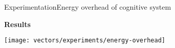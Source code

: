 \begin{frame}{Experimentation}{Energy overhead of cognitive system}
\vspace{-0.3cm}
\begin{block}{\small \textbf{Results}}
{
  \centering
  \texttt{[image: vectors/experiments/energy-overhead]}
  \par
}
\end{block}




\end{frame}

